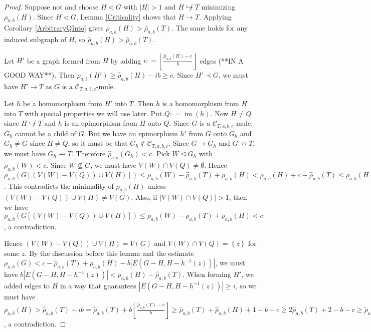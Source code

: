 \documentclass[12pt]{amsart}
\theoremstyle{plain}
\theoremstyle{definition}
\theoremstyle{remark}
\newcommand{\fancy}[1]{\mathcal{#1}}
\newcommand{\C}{\fancy{C}}
\newcommand{\inj}{\hookrightarrow}
\newcommand{\set}[1]{\left\{ #1 \right\}}
\newcommand{\card}[1]{\left|#1\right|}
\newcommand{\floor}[1]{\left\lfloor#1\right\rfloor}
\newcommand{\parens}[1]{\left( #1 \right)}
\newcommand{\brackets}[1]{\left[ #1 \right]}
\newcommand{\DefinedAs}{\mathrel{\mathop:}=}
\newcommand{\im}{\operatorname{im}}
\begin{document}
\begin{proof}
Suppose not and choose $H \lhd G$ with $|H| > 1$ and $H \not \inj T$ minimizing $\rho_{a,b}(H)$. Since $H \lhd G$, Lemma \ref{Criticality} shows that $H \rightarrow T$. Applying Corollary \ref{ArbitraryQInto} gives $\rho_{a,b}(H) > \hat{\rho}_{a,b}(T)$.  The same holds for any induced subgraph of $H$, so $\hat{\rho}_{a,b}(H) > \hat{\rho}_{a,b}(T)$.

Let $H'$ be a graph formed from $H$ by adding $i \DefinedAs \floor{\frac{\hat{\rho}_{a,b}(H) - c}{b}}$ edges (**IN A GOOD WAY**).  Then $\hat{\rho}_{a,b}(H') \ge \hat{\rho}_{a,b}(H) - ib \ge c$.  Since $H' \prec G$, we must have $H' \rightarrow T$ as $G$ is a $\C_{T,a,b,c}$-mule.

Let $h$ be a homomorphism from $H'$ into $T$.  Then $h$ is a homomorphism from $H$ into $T$ with special properties we will use later.   Put $Q \DefinedAs \im(h)$. Now $H \ne Q$ since $H \not \inj T$ and $h$ is an epimorphism from $H$ onto $Q$. Since $G$ is a $\C_{T,a,b,c}$-mule, $G_h$ cannot be a child of $G$.  But we have an epimorphism $h'$ from $G$ onto $G_h$ and $G_h \ne G$ since $H \ne Q$, so it must be that $G_h \not \in \C_{T,a,b,c}$.  Since $G \rightarrow G_h$ and $G \not \rightarrow T$, we must have $G_h \not \rightarrow T$.  Therefore $\hat{\rho}_{a,b}(G_h) < c$.  Pick $W \unlhd G_h$ with $\rho_{a,b}(W) < c$.  Since $W \not \subseteq G$, we must have $V(W) \cap V(Q) \ne \emptyset$.  Hence $\rho_{a,b}\parens{G\brackets{(V(W) - V(Q)) \cup V(H)}} \le \rho_{a,b}(W) - \hat{\rho}_{a,b}(T) + \rho_{a,b}(H) < \rho_{a,b}(H) + c - \hat{\rho}_{a,b}(T) \le \rho_{a,b}(H)$.  This contradicts the minimality of $\rho_{a,b}(H)$ unless $(V(W) - V(Q)) \cup V(H) \ne V(G)$.  Also, if $\card{V(W) \cap V(Q)} > 1$, then we have $\rho_{a,b}\parens{G\brackets{(V(W) - V(Q)) \cup V(H)}} \le \rho_{a,b}(W) - \tilde{\rho}_{a,b}(T) + \rho_{a,b}(H) < c$, a contradiction.

Hence $(V(W) - V(Q)) \cup V(H) = V(G)$ and $V(W) \cap V(Q) = \set{z}$ for some $z$.  By the discussion before this lemma and the estimate $\rho_{a,b}(G) < c - \hat{\rho}_{a,b}(T) + \rho_{a,b}(H) - b\card{E(G - H , H - h^{-1}(z))}$, we must have $b\card{E(G - H , H - h^{-1}(z))} < \rho_{a,b}(H) - \hat{\rho}_{a,b}(T)$.  When forming $H'$, we added edges to $H$ in a way that guarantees $\card{E(G - H , H - h^{-1}(z))} \ge i$, so we must have $\rho_{a,b}(H) > \hat{\rho}_{a,b}(T) + ib = \hat{\rho}_{a,b}(T) + b\floor{\frac{\hat{\rho}_{a,b}(T) - c}{b}} \ge \hat{\rho}_{a,b}(T) + \hat{\rho}_{a,b}(H) + 1 - b - c \ge 2\hat{\rho}_{a,b}(T) + 2 - b - c \ge \tilde{\rho}_{a,b}(T)$, a contradiction.
\end{proof}



\end{document}
